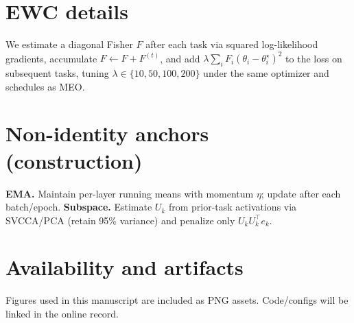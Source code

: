 \documentclass[11pt]{article}
\begin{document}
\section{EWC details}
We estimate a diagonal Fisher $F$ after each task via squared log-likelihood gradients, accumulate $F\!\leftarrow\!F+F^{(t)}$, and add $\lambda\sum_i F_i(\theta_i-\theta_i^\star)^2$ to the loss on subsequent tasks, tuning $\lambda\in\{10,50,100,200\}$ under the same optimizer and schedules as MEO.

\section{Non-identity anchors (construction)}
\textbf{EMA.} Maintain per-layer running means with momentum $\eta$; update after each batch/epoch. \textbf{Subspace.} Estimate $U_k$ from prior-task activations via SVCCA/PCA (retain 95\% variance) and penalize only $U_kU_k^\top e_k$.

\section*{Availability and artifacts}
Figures used in this manuscript are included as PNG assets. Code/configs will be linked in the online record.
\end{document}
